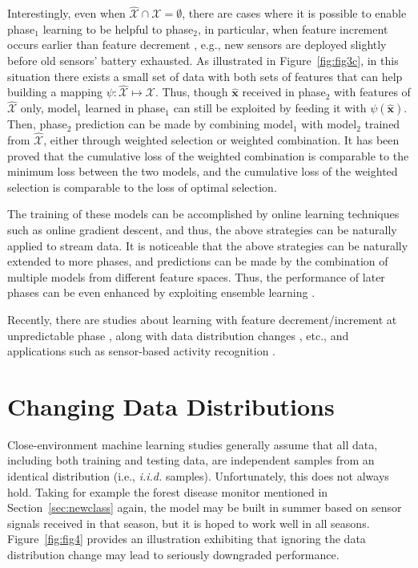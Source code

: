 \documentclass[review,11pt]{ReportTemplate}
\begin{document}
Interestingly, even when $\hat{\mathcal{X}} \cap \mathcal{X} = \emptyset$, there are cases where it is possible to enable phase$_1$ learning to be helpful to phase$_2$, in particular, when feature increment occurs earlier than feature decrement \cite{Hou:Zhang:Zhou2017}, e.g., new sensors are deployed slightly before old sensors' battery exhausted. As illustrated in Figure~\ref{fig:fig3c}, in this situation there exists a small set of data with both sets of features that can help building a mapping $\psi: \hat{\mathcal{X}} \mapsto \mathcal{X}$. Thus, though $\hat{\bm{x}}$ received in phase$_2$ with features of $\hat{\mathcal{X}}$ only, model$_1$ learned in phase$_1$ can still be exploited by feeding it with $\psi(\hat{\bm{x}})$. Then, phase$_2$ prediction can be made by combining model$_1$ with model$_2$ trained from $\hat{\mathcal{X}}$, either through weighted selection or weighted combination. It has been proved that the cumulative loss of the weighted combination is comparable to the minimum loss between the two models, and the cumulative loss of the weighted selection is comparable to the loss of optimal selection.

The training of these models can be accomplished by online learning techniques such as online gradient descent, and thus, the above strategies can be naturally applied to stream data. It is noticeable that the above strategies can be naturally extended to more phases, and predictions can be made by the combination of multiple models from different feature spaces. Thus, the performance of later phases can be even enhanced by exploiting ensemble learning \cite{Zhou2012}.

Recently, there are studies about learning with feature decrement/increment at unpredictable phase \cite{Hou:Zhang:Zhou2021}, along with data distribution changes \cite{Zhang:Zhao:Jiang:Zhou2020}, 
etc., and applications such as sensor-based activity recognition \cite{Hu:Chen:Peng:Yu2019}.


\section{Changing Data Distributions}\label{sec:changeDistribution}

Close-environment machine learning studies generally assume that all data, including both training and testing data, are independent samples from an identical distribution (i.e., \textit{i.i.d.} samples). Unfortunately, this does not always hold. Taking for example the forest disease monitor mentioned in Section~\ref{sec:newclass} again, the model may be built in summer based on sensor signals received in that season, but it is hoped to work well in all seasons. Figure~\ref{fig:fig4} provides an illustration exhibiting that ignoring the data distribution change may lead to seriously downgraded performance.
\end{document}
